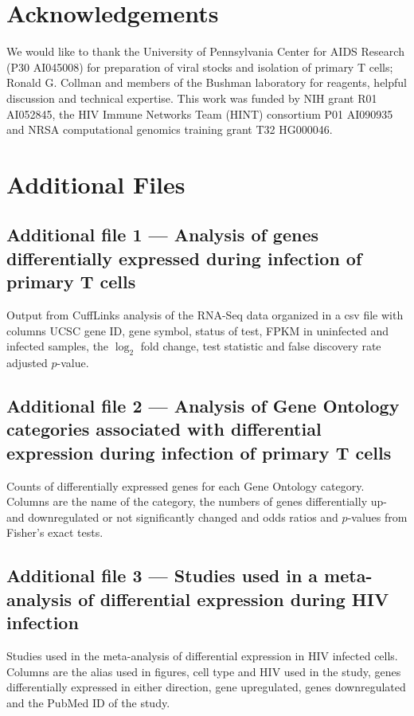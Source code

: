 \documentclass[../sherrill-Mix_thesis.tex]{subfiles}
\begin{document}
\section{Acknowledgements}
  We would like to thank the University of Pennsylvania Center for AIDS Research (P30 AI045008) for preparation of viral stocks and isolation of primary \cdFour{} T cells; Ronald G. Collman and members of the Bushman laboratory for reagents, helpful discussion and technical expertise. This work was funded by NIH grant R01 AI052845, the HIV Immune Networks Team (HINT) consortium P01 AI090935 and NRSA computational genomics training grant T32 HG000046.  

\clearpage %
\section{Additional Files}
  \subsection{Additional file 1 ---  Analysis of genes differentially expressed during \hivEight{} infection of primary \cdFour{} T cells}
		Output from CuffLinks analysis of the RNA-Seq data organized in a csv file with columns UCSC gene ID, gene symbol, status of test, FPKM in uninfected and infected samples, the $\log_2$ fold change, test statistic and false discovery rate adjusted $p$-value.


  \subsection{Additional file 2 --- Analysis of Gene Ontology categories associated with differential expression during \hivEight{} infection of primary \cdFour{} T cells}
		Counts of differentially expressed genes for each Gene Ontology category. Columns are the name of the category, the numbers of genes differentially up- and downregulated or not significantly changed and odds ratios and $p$-values from Fisher's exact tests.

  \subsection{Additional file 3 --- Studies used in a meta-analysis of differential expression during HIV infection}
		Studies used in the meta-analysis of differential expression in HIV infected cells. Columns are the alias used in figures, cell type and HIV used in the study, genes differentially expressed in either direction, gene upregulated, genes downregulated and the PubMed ID of the study.
\end{document}
